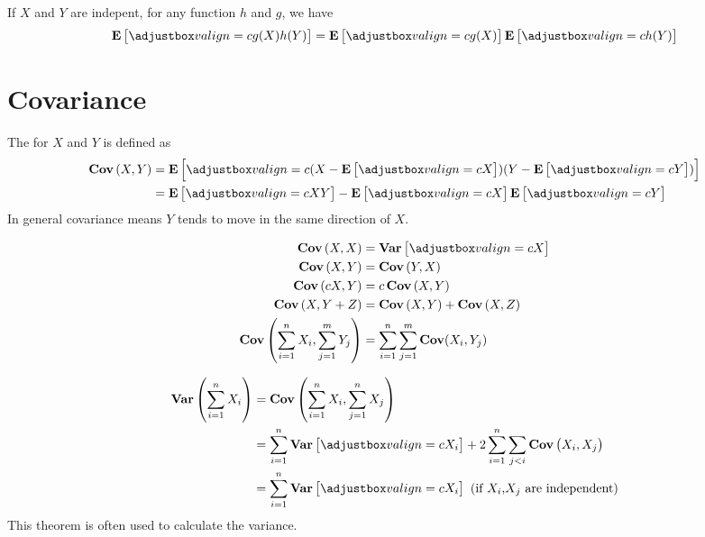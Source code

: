 \begin{theorem}
    If $X$ and $Y$ are indepent, for any function $h$ and $g$, we have
    \begin{equation}
        \expect{g(X) h(Y)} = \expect{g(X)} \expect{h(Y)}
    \end{equation}    
\end{theorem}

\section{Covariance}

\begin{definition}[covariance]
    The  for $X$ and $Y$ is defined as 
    \begin{equation}
    \begin{aligned}
        \covariance{X}{Y} &= \expect{(X - \expect{X})(Y - \expect{Y})} \\
        &= \expect{XY} - \expect{X} \expect{Y}
    \end{aligned}
    \end{equation}
    In general covariance means $Y$ tends to move in the same direction of $X$.
\end{definition}

\begin{theorem}
    \begin{equation}
        \begin{aligned}
            \covariance{X}{X} &= \variance{X} \\
            \covariance{X}{Y} &= \covariance{Y}{X} \\
            \covariance{cX}{Y} &= c \covariance{X}{Y} \\
            \covariance{X}{Y + Z} &= \covariance{X}{Y} + \covariance{X}{Z} \\
            \mathhilight{Cov} \left(\sum_{i=1}^n X_i, \sum_{j=1}^m Y_j \right) &= \sum_{i=1}^n \sum_{j=1}^m \mathhilight{Cov}(X_i, Y_j) \\
        \end{aligned}
    \end{equation}    
\end{theorem}

\begin{theorem}
    \begin{equation}
    \begin{aligned}
        \mathhilight{Var} \left( \sum_{i=1}^n X_i \right) &= \mathhilight{Cov}\left( \sum_{i=1}^n X_i, \sum_{j=1}^n X_j \right) \\
        &= \sum_{i=1}^n \variance{X_i} + 2 \sum_{i=1}^n \sum_{j < i} \covariance{X_i}{X_j} \\
        &= \sum_{i=1}^n \variance{X_i} \text{ (if } X_i \text{,} X_j \text{ are independent)}
    \end{aligned}
    \end{equation}
    This theorem is often used to calculate the variance.
\end{theorem}

